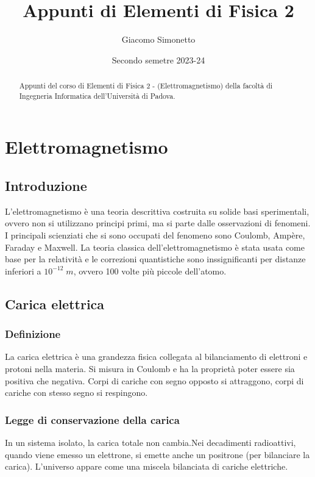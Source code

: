 \documentclass[a4paper]{article}
\title{Appunti di Elementi di Fisica 2}
\author{Giacomo Simonetto}
\date{Secondo semetre 2023-24}
\begin{document}
\maketitle
\begin{abstract}
	Appunti del corso di Elementi di Fisica 2 - (Elettromagnetismo) della facoltà di Ingegneria Informatica dell'Università di Padova.
\end{abstract}

\newpage

\tableofcontents

\newpage

\section{Elettromagnetismo}
\subsection{Introduzione}
L'elettromagnetismo è una teoria descrittiva costruita su solide basi sperimentali, ovvero non si utilizzano principi primi, ma
si parte dalle osservazioni di fenomeni. I principali scienziati che si sono occupati del fenomeno sono Coulomb, Ampère, Faraday
e Maxwell. La teoria classica dell'elettromagnetismo è stata usata come base per la relatività e le correzioni quantistiche sono
inssignificanti per distanze inferiori a \(10^{-12} \; m\), ovvero 100 volte più piccole dell'atomo.

\subsection{Carica elettrica}
\subsubsection*{Definizione}
La carica elettrica è una grandezza fisica collegata al bilanciamento di elettroni e protoni nella materia. Si misura in Coulomb
e ha la proprietà poter essere sia positiva che negativa. Corpi di cariche con segno opposto si attraggono, corpi di cariche con
stesso segno si respingono.

\subsubsection*{Legge di conservazione della carica}
In un sistema isolato, la carica totale non cambia.Nei decadimenti radioattivi, quando viene emesso un elettrone, si emette anche
un positrone (per bilanciare la carica). L'universo appare come una miscela bilanciata di cariche elettriche.
\end{document}
